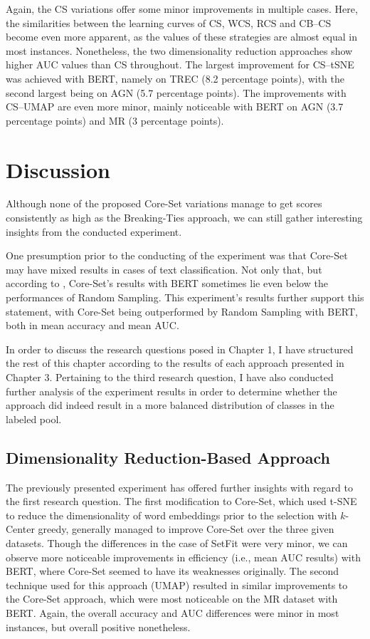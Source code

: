 \documentclass[english,bachelor,ul]{webisthesis} %
\begin{document}
Again, the CS variations offer some minor improvements in multiple cases. Here, the similarities between the learning curves of CS, WCS, RCS and CB--CS become even more apparent, as the values of these strategies are almost equal in most instances. Nonetheless, the two dimensionality reduction approaches show higher AUC values than CS throughout. The largest improvement for CS--tSNE was achieved with BERT, namely on TREC (8.2 percentage points), with the second largest being on AGN (5.7 percentage points). The improvements with CS--UMAP are even more minor, mainly noticeable with BERT on AGN (3.7 percentage points) and MR (3 percentage points). 

\chapter{Discussion}

Although none of the proposed Core-Set variations manage to get scores consistently as high as the Breaking-Ties approach, we can still gather interesting insights from the conducted experiment. 

One presumption prior to the conducting of the experiment was that Core-Set may have mixed results in cases of text classification. Not only that, but according to \cite{DBLP:conf/kdd/0002MM21}, Core-Set's results with BERT sometimes lie even below the performances of Random Sampling. This experiment's results further support this statement, with Core-Set being outperformed by Random Sampling with BERT, both in mean accuracy and mean AUC.

In order to discuss the research questions posed in Chapter 1, I have structured the rest of this chapter according to the results of each approach presented in Chapter 3. Pertaining to the third research question, I have also conducted further analysis of the experiment results in order to determine whether the approach did indeed result in a more balanced distribution of classes in the labeled pool.

\section{Dimensionality Reduction-Based Approach}

The previously presented experiment has offered further insights with regard to the first research question. The first modification to Core-Set, which used t-SNE to reduce the dimensionality of word embeddings prior to the selection with $k$-Center greedy, generally managed to improve Core-Set over the three given datasets. Though the differences in the case of SetFit were very minor, we can observe more noticeable improvements in efficiency (i.e., mean AUC results) with BERT, where Core-Set seemed to have its weaknesses originally. The second technique used for this approach (UMAP) resulted in similar improvements to the Core-Set approach, which were most noticeable on the MR dataset with BERT. Again, the overall accuracy and AUC differences were minor in most instances, but overall positive nonetheless.
\end{document}
